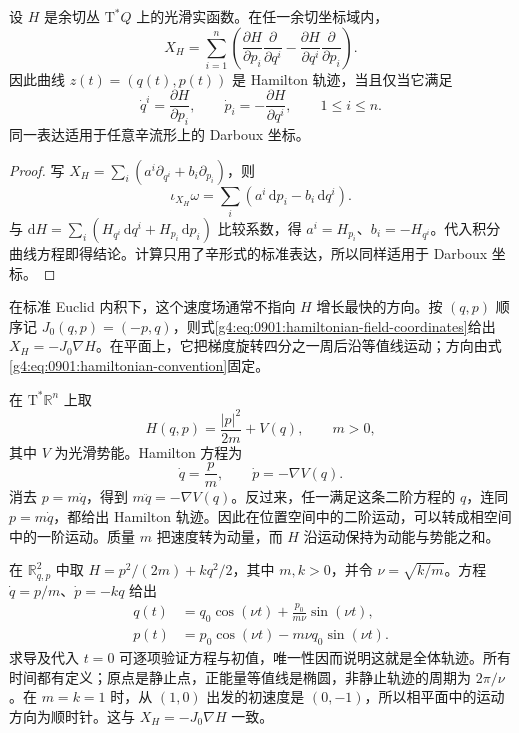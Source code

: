 \begin{proposition}\label{g4:prop:0901:hamiltonian-coordinates}
	设 \(H\) 是余切丛 \(\mathrm{T}^*Q\) 上的光滑实函数。在任一余切坐标域内，
	\begin{equation}\label{g4:eq:0901:hamiltonian-field-coordinates}
		X_H=\sum_{i=1}^n\left(
		\frac{\partial H}{\partial p_i}\frac{\partial}{\partial q^i}
		-\frac{\partial H}{\partial q^i}\frac{\partial}{\partial p_i}
		\right).
	\end{equation}
	因此曲线 \(z(t)=(q(t),p(t))\) 是 Hamilton 轨迹，当且仅当它满足
	\begin{equation}\label{g4:eq:0901:hamilton-equations}
		\dot q^i=\frac{\partial H}{\partial p_i},
		\qquad \dot p_i=-\frac{\partial H}{\partial q^i},
		\qquad 1\le i\le n.
	\end{equation}
	同一表达适用于任意辛流形上的 Darboux 坐标。
\end{proposition}
\begin{proof}
	写 \(X_H=\sum_i(a^i\partial_{q^i}+b_i\partial_{p_i})\)，则
	\[
		\iota_{X_H}\omega=\sum_i(a^i\,\mathrm{d}p_i-b_i\,\mathrm{d}q^i).
	\]
	与 \(\mathrm{d}H=\sum_i(H_{q^i}\,\mathrm{d}q^i+H_{p_i}\,\mathrm{d}p_i)\) 比较系数，得 \(a^i=H_{p_i}\)、\(b_i=-H_{q^i}\)。代入积分曲线方程即得结论。计算只用了辛形式的标准表达，所以同样适用于 Darboux 坐标。
\end{proof}

在标准 Euclid 内积下，这个速度场通常不指向 \(H\) 增长最快的方向。按 \((q,p)\) 顺序记 \(J_0(q,p)=(-p,q)\)，则式\eqref{g4:eq:0901:hamiltonian-field-coordinates}给出 \(X_H=-J_0\nabla H\)。在平面上，它把梯度旋转四分之一周后沿等值线运动；方向由式\eqref{g4:eq:0901:hamiltonian-convention}固定。

\begin{example}\label{g4:exm:0901:mechanical-system}
	在 \(\mathrm{T}^*\mathbb R^n\) 上取
	\[
		H(q,p)=\frac{|p|^2}{2m}+V(q),\qquad m>0,
	\]
	其中 \(V\) 为光滑势能。Hamilton 方程为
	\[
		\dot q=\frac pm,\qquad \dot p=-\nabla V(q).
	\]
	消去 \(p=m\dot q\)，得到 \(m\ddot q=-\nabla V(q)\)。反过来，任一满足这条二阶方程的 \(q\)，连同 \(p=m\dot q\)，都给出 Hamilton 轨迹。因此在位置空间中的二阶运动，可以转成相空间中的一阶运动。质量 \(m\) 把速度转为动量，而 \(H\) 沿运动保持为动能与势能之和。\cite[第5.1节，第140页]{Cannas2006Symplectic}
\end{example}

\begin{example}\label{g4:exm:0901:harmonic-oscillator}
	在 \(\mathbb R^2_{q,p}\) 中取 \(H=p^2/(2m)+kq^2/2\)，其中 \(m,k>0\)，并令 \(\nu=\sqrt{k/m}\)。方程 \(\dot q=p/m\)、\(\dot p=-kq\) 给出
	\[
		\begin{aligned}
			q(t)&=q_0\cos(\nu t)+\frac{p_0}{m\nu}\sin(\nu t),\\
			p(t)&=p_0\cos(\nu t)-m\nu q_0\sin(\nu t).
		\end{aligned}
	\]
	求导及代入 \(t=0\) 可逐项验证方程与初值，唯一性因而说明这就是全体轨迹。所有时间都有定义；原点是静止点，正能量等值线是椭圆，非静止轨迹的周期为 \(2\pi/\nu\)。在 \(m=k=1\) 时，从 \((1,0)\) 出发的初速度是 \((0,-1)\)，所以相平面中的运动方向为顺时针。这与 \(X_H=-J_0\nabla H\) 一致。
\end{example}

